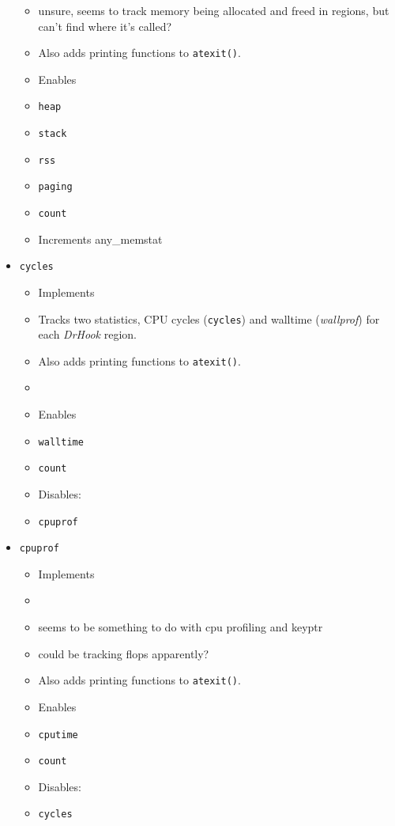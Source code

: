 \begin{itemize}
\begin{itemize}
        \item unsure, seems to track memory being allocated and freed in regions, but can't find where it's called?
        \item Also adds printing functions to \texttt{atexit()}.
        \item[] Enables
        \item \verb+heap+
        \item \verb+stack+
        \item \verb+rss+
        \item \verb+paging+
        \item \verb+count+
        \item Increments any\_memstat
    \end{itemize}
    \item\verb+cycles+
    \begin{itemize}
        \item[] Implements
        \item Tracks two statistics, CPU cycles (\texttt{cycles}) and walltime (\textit{wallprof}) for each \textit{DrHook} region.
        \item Also adds printing functions to \texttt{atexit()}.
        \item {}
        \item[] Enables
        \item \verb+walltime+
        \item \verb+count+
        \item[] Disables:
        \item \verb+cpuprof+
    \end{itemize}
    \item\verb+cpuprof+
    \begin{itemize}
        \item[] Implements
        \item {}
        \item seems to be something to do with cpu profiling and keyptr
        \item could be tracking flops apparently?
        \item Also adds printing functions to \texttt{atexit()}.
        \item[] Enables
        \item \verb+cputime+
        \item \verb+count+
        \item[] Disables:
        \item \verb+cycles+

\end{itemize}
\end{itemize}
